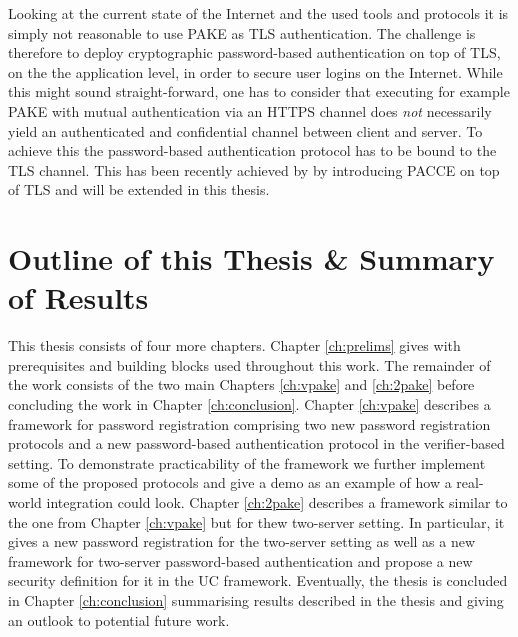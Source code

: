 Looking at the current state of the Internet and the used tools and protocols it is simply not reasonable to use \ac{PAKE} as \ac{TLS} authentication.
The challenge is therefore to deploy cryptographic password-based authentication on top of \ac{TLS}, \ie on the the application level, in order to secure user logins on the Internet.
While this might sound straight-forward, one has to consider that executing for example \ac{PAKE} with mutual authentication via an \ac{HTTPS} channel does \emph{not} necessarily yield an authenticated and confidential channel between client and server.
To achieve this the password-based authentication protocol has to be bound to the \ac{TLS} channel.
This has been recently achieved by \citet{MSD13} by introducing \ac{PACCE} on top of \ac{TLS} and will be extended in this thesis.


\section{Outline of this Thesis \& Summary of Results}\label{sec:intro:outline}
This thesis consists of four more chapters.
Chapter \ref{ch:prelims} gives with prerequisites and building blocks used throughout this work.
The remainder of the work consists of the two main Chapters \ref{ch:vpake} and \ref{ch:2pake} before concluding the work in Chapter \ref{ch:conclusion}.
Chapter \ref{ch:vpake} describes a framework for password registration comprising two new password registration protocols and a new password-based authentication protocol in the verifier-based setting.
To demonstrate practicability of the framework we further implement some of the proposed protocols and give a demo as an example of how a real-world integration could look.
Chapter \ref{ch:2pake} describes a framework similar to the one from Chapter \ref{ch:vpake} but for thew two-server setting.
In particular, it gives a new password registration for the two-server setting as well as a new framework for two-server password-based authentication and propose a new security definition for it in the \ac{UC} framework.
Eventually, the thesis is concluded in Chapter \ref{ch:conclusion} summarising results described in the thesis and giving an outlook to potential future work.




